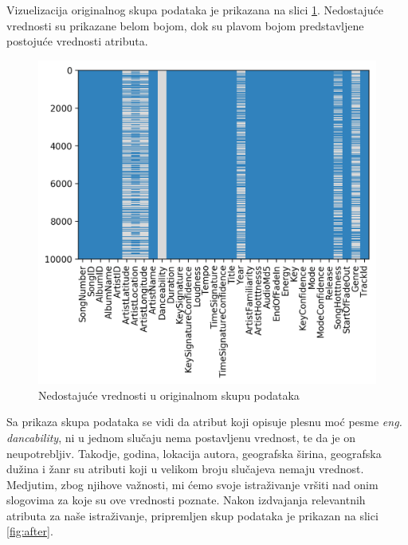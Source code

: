 
Vizuelizacija originalnog skupa podataka je prikazana na slici \ref{fig:before}. Nedostaju\'c{}e vrednosti su prikazane belom bojom, dok su plavom bojom predstavljene postoju\'c{}e vrednosti atributa.

\begin{figure}[H]
    \includegraphics[scale=0.8]{resources/before_processing.png}
    \caption{Nedostaju\'c{}e vrednosti u originalnom skupu podataka}
    \label{fig:before}
\end{figure}

 Sa prikaza skupa podataka se vidi da atribut koji opisuje plesnu mo\'c{} pesme \emph{eng. dancability}, ni u jednom slu\v{c}aju nema postavljenu vrednost, te da je on neupotrebljiv. Takodje, godina, lokacija autora, geografska \v{s}irina, geografska du\v{z}ina i \v{z}anr su atributi koji u velikom broju slu\v{c}ajeva nemaju vrednost. Medjutim, zbog njihove va\v{z}nosti, mi \'c{}emo svoje istra\v{z}ivanje vr\v{s}iti nad onim slogovima za koje su ove vrednosti poznate. Nakon izdvajanja relevantnih atributa za na\v{s}e istra\v{z}ivanje, pripremljen skup podataka je prikazan na slici \ref{fig:after}.

